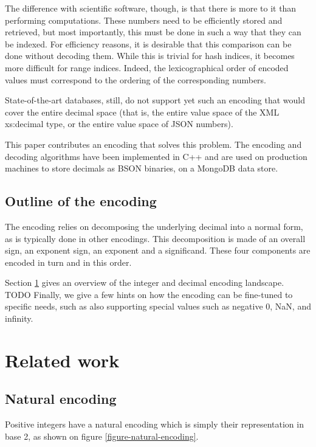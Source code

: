 \documentclass{acm_proc_article-sp}
\begin{document}
The difference with scientific software, though, is that there is more to it than performing computations. These numbers need to be efficiently stored and retrieved, but most importantly, this must be done in such a way that they can be indexed. For efficiency reasons, it is desirable that this comparison can be done without decoding them. While this is trivial for hash indices, it becomes more difficult for range indices. Indeed, the lexicographical order of encoded values must correspond to the ordering of the corresponding numbers.

State-of-the-art databases, still, do not support yet such an encoding that would cover the entire decimal space (that is, the entire value space of the XML xs:decimal type, or the entire value space of JSON numbers).

This paper contributes an encoding that solves this problem. The encoding and decoding algorithms have been implemented in C++ and are used on production machines to store decimals as BSON binaries, on a MongoDB data store.

\subsection{Outline of the encoding}

The encoding relies on decomposing the underlying decimal into a normal form, as is typically done in other encodings. This decomposition is made of an overall sign, an exponent sign, an exponent and a significand. These four components are encoded in turn and in this order.

Section \ref{section-related-work} gives an overview of the integer and decimal encoding landscape.
TODO
Finally, we give a few hints on how the encoding can be fine-tuned to specific needs, such as also supporting special values such as negative 0, NaN, and infinity.

\section{Related work}
\label{section-related-work}

\subsection{Natural encoding}

Positive integers have a natural encoding which is simply their representation in base 2, as shown on figure \ref{figure-natural-encoding}.
\end{document}
